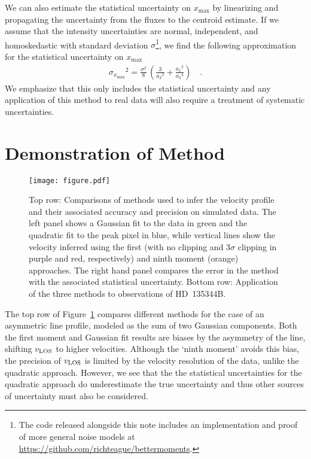 \documentclass[rnaas]{aastex62}
\begin{document}
We can also estimate the statistical uncertainty on $x_\mathrm{max}$ by
linearizing and propagating the uncertainty from the fluxes to the centroid
estimate.
If we assume that the intensity uncertainties are normal, independent, and
homoskedastic with standard deviation $\sigma$\footnote{The code released
alongside this note includes an implementation and proof of more general noise
models at \url{https://github.com/richteague/bettermoments}.}, we find the
following approximation for the statistical uncertainty on $x_\mathrm{max}$
\begin{eqnarray}
{\sigma_{x_\mathrm{max}}}^2 = \frac{\sigma^2}{8}\,\left(
    \frac{3}{{a_2}^2} + \frac{{a_1}^2}{{a_2}^4}
\right)\quad.
\end{eqnarray}
We emphasize that this only includes the statistical uncertainty and any
application of this method to real data will also require a treatment of
systematic uncertainties.

\section{Demonstration of Method}

\begin{figure}[htbp]
\centering
\texttt{[image: figure.pdf]}
\caption{Top row: Comparisons of methods used to infer the velocity profile and their associated accuracy and precision on simulated data. The left panel shows a Gaussian fit to the data in green and the quadratic fit to the peak pixel in blue, while vertical lines show the velocity inferred using the first (with no clipping and $3\sigma$ clipping in purple and red, respectively) and ninth moment (orange) approaches. The right hand panel compares the error in the method with the associated statistical uncertainty. Bottom row: Application of the three methods to observations of HD~135344B. \label{figure}}
\end{figure}

The top row of Figure~\ref{figure} compares different methods for the case of an asymmetric line profile, modeled as the sum of two Gaussian components.
Both the first moment and Gaussian fit results are biases by the asymmetry of the line, shifting $v_{\rm LOS}$ to higher velocities.
Although the `ninth moment' avoids this bias, the precision of $v_{\rm LOS}$ is limited by the velocity resolution of the data, unlike the quadratic approach.
However, we see that the the statistical uncertainties for the quadratic approach do underestimate the true uncertainty and thus other sources of uncertainty must also be considered.
\end{document}
